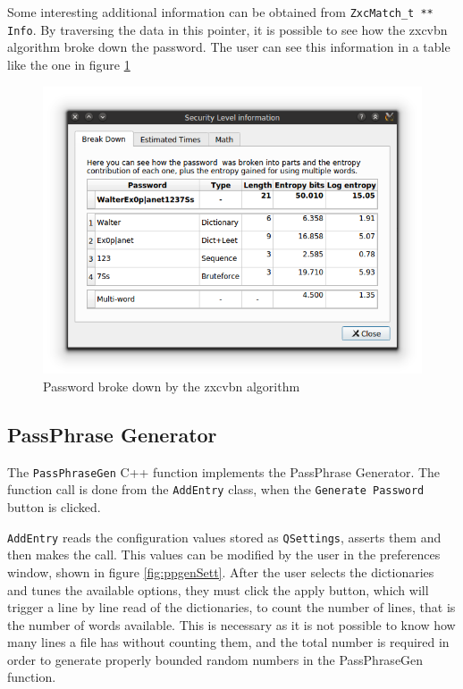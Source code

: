 Some interesting additional information can be obtained from \texttt{ZxcMatch\_t ** Info}. By traversing the data in this pointer, it is possible to see how the zxcvbn algorithm broke down the password. The user can see this information in a table like the one in figure \ref{fig:zxcvbnBreak}
\begin{figure}[htb]    
  \centering
  \captionsetup{justification=centering}
  \includegraphics[width=0.9\columnwidth]{chapters/figures/development/zxcvbnBreak}
  \caption{Password broke down by the zxcvbn algorithm}
  \label{fig:zxcvbnBreak}
\end{figure}



\subsection{PassPhrase Generator} \label{sec:ppgen}

The \texttt{PassPhraseGen} C++ function implements the PassPhrase Generator. The function call is done from the \texttt{AddEntry} class, when the \texttt{Generate Password} button is clicked.

\texttt{AddEntry} reads the configuration values stored as \texttt{QSettings}, asserts them and then makes the call. This values can be modified by the user in the preferences window, shown in figure \ref{fig:ppgenSett}. After the user selects the dictionaries and tunes the available options, they must click the apply button, which will trigger a line by line read of the dictionaries, to count the number of lines, that is the number of words available. This is necessary as it is not possible to know how many lines a file has without counting them, and the total number is required in order to generate properly bounded random numbers in the PassPhraseGen function.


